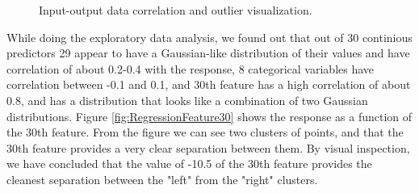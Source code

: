 \documentclass{article} %
\begin{document}
\begin{figure}[!t]
	\center
	\hfill
	\caption{Input-output data correlation and outlier visualization.}
\end{figure}

 While doing the exploratory data analysis, we found out that out of 30
 continious predictors 29 appear to have a Gaussian-like distribution of their
 values and have correlation of about 0.2-0.4 with the response, 8 categorical
 variables have correlation between -0.1 and 0.1, and 30th feature has a high
 correlation of about 0.8, and has a distribution that looks like a combination
 of two Gaussian distributions.
  Figure \ref{fig:RegressionFeature30} shows the
 response as a function of the 30th feature.
 From the figure we can see two clusters of points, and that the 30th feature
 provides a very clear separation between them.
  By visual inspection, we have concluded that the value of -10.5 of the 30th
  feature provides the cleanest separation between the "left" from the "right" clusters.
\end{document}

